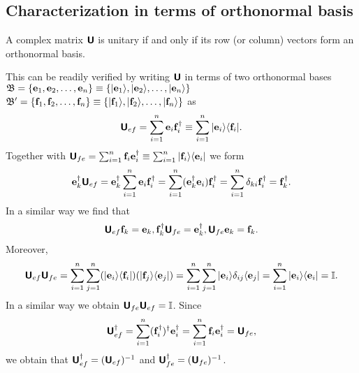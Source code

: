 \subsection {Characterization in terms of orthonormal basis}
\label{2012-m-ch-citoob}


A complex matrix $\textsf{\textbf{U}}$ is unitary if and only if its row (or column) vectors form
an orthonormal basis.

This can be readily verified \cite{Schwinger.60} by writing $\textsf{\textbf{U}}$
in terms of two orthonormal bases
${\frak B}=\{{\bf e}_1,  {\bf e}_2, \ldots , {\bf e}_n\}\equiv \{\vert {\bf e}_1\rangle , \vert  {\bf e}_2\rangle , \ldots , \vert {\bf e}_n\rangle \}$
${\frak B}'=\{{\bf f}_1,  {\bf f}_2, \ldots , {\bf f}_n\}\equiv \{\vert {\bf f}_1\rangle , \vert  {\bf f}_2\rangle , \ldots , \vert {\bf f}_n\rangle \}$ as
\begin{equation}
\textsf{\textbf{U}}_{ef}= \sum_{i=1}^n  {\bf e}_i {\bf f}_i^\dagger
\equiv \sum_{i=1}^n  \vert {\bf e}_i\rangle \langle {\bf f}_i \vert
.
\end{equation}
Together with $\textsf{\textbf{U}}_{fe}= \sum_{i=1}^n  {\bf f}_i {\bf e}_i^\dagger \equiv  \sum_{i=1}^n  \vert {\bf f}_i\rangle \langle {\bf e}_i \vert $
we form
\begin{equation}
\begin{split}
{\bf e}_k^\dagger \textsf{\textbf{U}}_{ef}  = {\bf e}_k^\dagger\sum_{i=1}^n  {\bf e}_i {\bf f}_i^\dagger
= \sum_{i=1}^n  ({\bf e}_k^\dagger {\bf e}_i) {\bf f}_i^\dagger
= \sum_{i=1}^n  \delta_{ki} {\bf f}_i^\dagger   = {\bf f}_k^\dagger
.
\end{split}
\end{equation}
In a similar way we find that
\begin{equation}
\begin{split}
\textsf{\textbf{U}}_{ef} {\bf f}_k = {\bf e}_k,
{\bf f}_k^\dagger \textsf{\textbf{U}}_{fe}   = {\bf e}_k^\dagger ,
\textsf{\textbf{U}}_{fe} {\bf e}_k  = {\bf f}_k .
\end{split}
\end{equation}
Moreover,
\begin{equation}
\begin{split}
\textsf{\textbf{U}}_{ef}\textsf{\textbf{U}}_{fe}
=
 \sum_{i=1}^n  \sum_{j=1}^n
(\vert {\bf e}_i\rangle \langle {\bf f}_i \vert )
(\vert {\bf f}_j\rangle \langle {\bf e}_j \vert )
=
 \sum_{i=1}^n  \sum_{j=1}^n
\vert {\bf e}_i\rangle \delta_{ij} \langle {\bf e}_j \vert
=
 \sum_{i=1}^n
\vert {\bf e}_i\rangle   \langle {\bf e}_i \vert
=
{\Bbb I}
.
\end{split}
\end{equation}
In a similar way we obtain
$\textsf{\textbf{U}}_{fe}\textsf{\textbf{U}}_{ef}=
{\Bbb I}$.
Since
\begin{equation}
\textsf{\textbf{U}}_{ef}^\dagger = \sum_{i=1}^n  ( {\bf f}_i^\dagger )^\dagger {\bf e}_i^\dagger
= \sum_{i=1}^n  {\bf f}_i {\bf e}_i^\dagger
= \textsf{\textbf{U}}_{fe},
\end{equation}
we obtain that $\textsf{\textbf{U}}_{ef}^\dagger = (\textsf{\textbf{U}}_{ef})^{-1}$
and $\textsf{\textbf{U}}_{fe}^\dagger = (\textsf{\textbf{U}}_{fe})^{-1}$.

